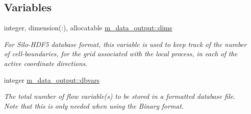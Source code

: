 \subsection*{Variables}
\begin{DoxyCompactItemize}
\item 
integer, dimension(\+:), allocatable \hyperlink{namespacem__data__output_a98d3ca969b0e32fa09436f1a9cfbd77c}{m\+\_\+data\+\_\+output\+::dims}
\begin{DoxyCompactList}\small\item\em For Silo-\/\+H\+D\+F5 database format, this variable is used to keep track of the number of cell-\/boundaries, for the grid associated with the local process, in each of the active coordinate directions. \end{DoxyCompactList}\item 
integer \hyperlink{namespacem__data__output_acc04177c6c6ab23be61767b187ece0ba}{m\+\_\+data\+\_\+output\+::dbvars}
\begin{DoxyCompactList}\small\item\em The total number of flow variable(s) to be stored in a formatted database file. Note that this is only needed when using the Binary format. \end{DoxyCompactList}\end{DoxyCompactItemize}

